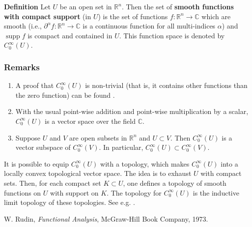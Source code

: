 \documentclass[12pt]{article}
\newcommand{\sR}[0]{\mathbb{R}}
\newcommand{\sC}[0]{\mathbb{C}}
\begin{document}
\newcommand{\cD}[0]{\mathcal{D}}
\newcommand{\scomp}[0]{C^\infty_0}

{\bf Definition} 
Let $U$ be an open set in $\sR^n$. Then the set of 
{\bf smooth functions with compact support} (in $U$) is the set
of functions $f:\sR^n \to \sC$ which are smooth 
(i.e., $\partial^\alpha f:\sR^n\to\sC$ 
is a continuous function for all multi-indices $\alpha$)
and $\operatorname{supp} f$ is compact and contained in $U$.
This function space is denoted by $C^\infty_0(U)$.

\subsubsection{Remarks}
\begin{enumerate}
\item  A proof that $C^\infty_0(U)$ is non-trivial (that is, it contains other functions
than the zero function) can be found 
. 
\item With the usual point-wise addition and point-wise multiplication 
by a scalar, $C^\infty_0(U)$ is a vector space over the field $\sC$.
\item Suppose $U$ and $V$ are open subsets in $\sR^n$ and $U\subset V$. 
Then $C^\infty_0(U)$ is a vector subspace of $C^\infty_0(V)$. 
In particular, $C^\infty_0(U)\subset C^\infty_0(V)$. 
\end{enumerate}

It is possible to equip $\scomp(U)$ with a topology, which makes 
$\scomp(U)$ into a locally convex topological vector space. The idea is
to exhaust $U$ with compact sets. Then, for each compact set $K\subset U$, 
one defines  a topology of smooth functions on $U$ with 
support on $K$. The topology for $C_0^\infty(U)$ is the inductive
limit topology of these topologies. See e.g. \cite{rudin_fap}. 


\begin{thebibliography}{9}
 W. Rudin, \emph{Functional Analysis},
 McGraw-Hill Book Company, 1973.
 \end{thebibliography}
\end{document}

